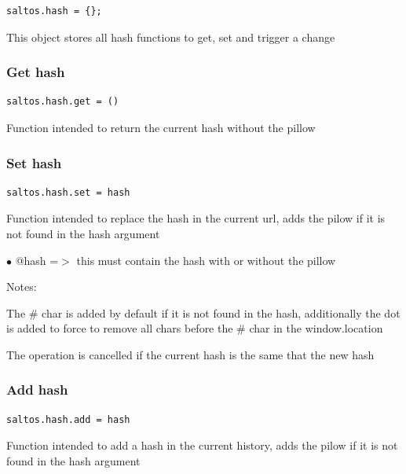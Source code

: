 \documentclass[a4paper]{article}
\begin{document}
\begin{lstlisting}
saltos.hash = {};
\end{lstlisting}

This object stores all hash functions to get, set and trigger a change

\hypertarget{toc252}{}
\subsubsection{Get hash}

\begin{lstlisting}
saltos.hash.get = ()
\end{lstlisting}

Function intended to return the current hash without the pillow

\hypertarget{toc253}{}
\subsubsection{Set hash}

\begin{lstlisting}
saltos.hash.set = hash
\end{lstlisting}

Function intended to replace the hash in the current url, adds the pilow if it is not found
in the hash argument

\begin{compactitem}
\item[\color{myblue}$\bullet$] @hash =$>$ this must contain the hash with or without the pillow
\end{compactitem}

Notes:

The \# char is added by default if it is not found in the hash, additionally the dot is
added to force to remove all chars before the \# char in the window.location

The operation is cancelled if the current hash is the same that the new hash

\hypertarget{toc254}{}
\subsubsection{Add hash}

\begin{lstlisting}
saltos.hash.add = hash
\end{lstlisting}

Function intended to add a hash in the current history, adds the pilow if it is not found
in the hash argument
\end{document}

